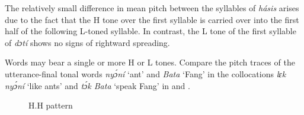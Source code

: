 
 
The relatively small difference in mean pitch between the syllables of \textit{hásis} arises due to the fact that the H tone over the first syllable is carried over into the first half of the following L-toned syllable. In contrast, the L tone of the first syllable of \textit{dɔtí} shows no signs of rightward spreading. 

Words may bear a single or more H or L tones. Compare the pitch traces of the utterance-final tonal words \textit{nyɔ́ní} ‘ant’ and \textit{Bata} ‘Fang’ in the collocations \textit{lɛk nyɔ́ní} ‘like ants’ and \textit{tɔ́k Bata} ‘speak Fang’ in  and .


\begin{figure}[b]
\caption{H.H pattern} 
\label{fig:key:3.7}
\end{figure}

